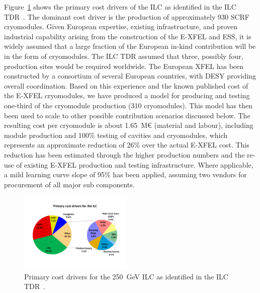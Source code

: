 \documentclass[%
 reprint,
 floatfix,
 amsmath,amssymb,
 aps,
]{revtex4-1}
\begin{document}
Figure~\ref{fig:constructionmodel:ILCPrimaryCostDrivers} shows the primary cost drivers of the ILC as identified in the ILC
TDR~\cite{Adolphsen:2013kya}. The dominant cost driver is the production of approximately 930 SCRF cryomodules. Given European expertise, 
existing infrastructure, and proven industrial capability arising from the construction 
of the E-XFEL and ESS, it is widely assumed that a large fraction of the European in-kind contribution 
will be in the form of cryomodules. The ILC TDR assumed that three, possibly four, production sites 
would be required worldwide. 
The European XFEL has been constructed by a consortium of several European
countries, with DESY providing overall coordination. Based on this experience 
and the known published cost of the E-XFEL cryomodules, we have produced a model 
for producing and testing one-third of the cryomodule production (310 
cryomodules). This model has then been used to scale to other possible 
contribution scenarios discussed below. The resulting cost per cryomodule is about 
1.65~M\euro{} (material and labour), including module production and 100\% 
testing of cavities and cryomodules, which represents an approximate reduction 
of 26\% over the actual E-XFEL cost. This reduction has been estimated through 
the higher production numbers and the re-use of existing E-XFEL production and 
testing infrastructure.  Where applicable, a mild learning curve slope of 95\% 
has been applied, assuming two vendors for procurement of all major sub 
components.

\begin{figure}[htbp]
\begin{center}
\includegraphics[width=0.4825\textwidth]{figures/eap-chp3-ilccostdrivers.pdf}
 \caption{\label{fig:constructionmodel:ILCPrimaryCostDrivers} Primary cost drivers for the 250~GeV ILC as identified in the ILC TDR~\cite{Adolphsen:2013kya}.}
\end{center}
\end{figure}
\end{document}
